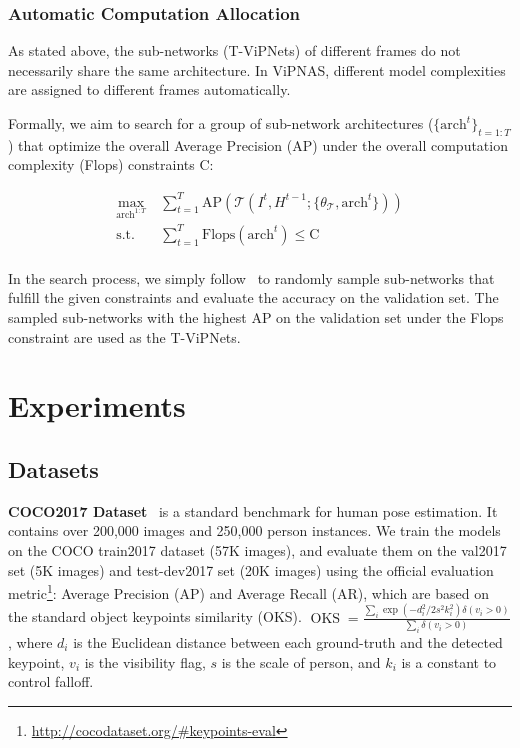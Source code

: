 \documentclass[final]{cvpr}
\begin{document}
\vspace{-5pt}
\subsubsection{Automatic Computation Allocation}

As stated above, the sub-networks (T-ViPNets) of different frames do not necessarily share the same architecture. In ViPNAS, different model complexities are assigned to different frames automatically. 

Formally, we aim to search for a group of sub-network architectures ($\{\textrm{arch}^{t}\}_{t=1:T}$) that optimize the overall Average Precision (AP) under the overall computation complexity (Flops) constraints $\textrm{C}$:

\vspace{-5pt}
\begin{equation}
\begin{aligned}
    \max_{\textrm{arch}^{1:T}}& \sum_{t=1}^T  \textrm{AP}(\mathcal{T}(I^t, H^{t-1} ; \{\theta_\mathcal{T}, \textrm{arch}^t\})) \\
\textrm{s.t.} \quad &\sum_{t=1}^T \textrm{Flops}(\textrm{arch}^t) \leq \textrm{C}\\
\end{aligned}
\label{eq:search_obj}
\end{equation}


In the search process, we simply follow~\cite{yu2020bignas} to randomly sample sub-networks that fulfill the given constraints and evaluate the accuracy on the validation set. The sampled sub-networks with the highest AP on the validation set under the Flops constraint are used as the T-ViPNets.



\section{Experiments}

\subsection{Datasets}
\textbf{COCO2017 Dataset}~\cite{lin2014microsoft} is a standard benchmark for human pose estimation. It contains over 200,000 images and 250,000 person instances. We train the models on the COCO train2017 dataset (57K images), and evaluate them on the val2017 set (5K images) and test-dev2017 set (20K images) using the official evaluation metric\footnote{\url{http://cocodataset.org/\#keypoints-eval}}: Average Precision (AP) and Average Recall (AR), which are based on the standard object keypoints similarity (OKS). $\operatorname{OKS} = \frac{\sum_{i}\exp(-d_i^2/2s^2k_i^2)\delta(v_i > 0)}{\sum_i \delta(v_i > 0)}$, where $d_i$ is the Euclidean distance between each ground-truth and the detected keypoint, $v_i$ is the visibility flag, $s$ is the scale of person, and $k_i$ is a constant to control falloff. 
\end{document}
